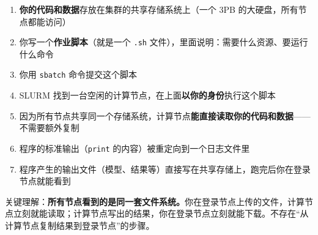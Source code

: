 \begin{enumerate}
  \item \textbf{你的代码和数据}存放在集群的共享存储系统上（一个 3PB 的大硬盘，所有节点都能访问）
  \item 你写一个\textbf{作业脚本}（就是一个 \texttt{.sh} 文件），里面说明：需要什么资源、要运行什么命令
  \item 你用 \texttt{sbatch} 命令提交这个脚本
  \item SLURM 找到一台空闲的计算节点，在上面\textbf{以你的身份}执行这个脚本
  \item 因为所有节点共享同一个存储系统，计算节点\textbf{能直接读取你的代码和数据}——不需要额外复制
  \item 程序的标准输出（\texttt{print} 的内容）被重定向到一个日志文件里
  \item 程序产生的输出文件（模型、结果等）直接写在共享存储上，跑完后你在登录节点就能看到
\end{enumerate}

\begin{tipbox}
关键理解：\textbf{所有节点看到的是同一套文件系统。}你在登录节点上传的文件，计算节点立刻就能读取；计算节点写出的结果，你在登录节点立刻就能下载。不存在``从计算节点复制结果到登录节点''的步骤。
\end{tipbox}
